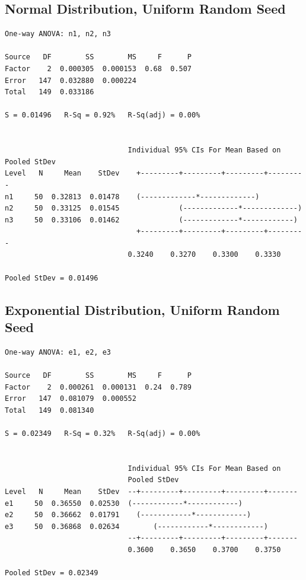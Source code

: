 \documentclass[letterpaper,10pt]{article}
\begin{document}
\subsection{Normal Distribution, Uniform Random Seed}
\begin{samepage}
\begin{verbatim}
One-way ANOVA: n1, n2, n3 

Source   DF        SS        MS     F      P
Factor    2  0.000305  0.000153  0.68  0.507
Error   147  0.032880  0.000224
Total   149  0.033186

S = 0.01496   R-Sq = 0.92%   R-Sq(adj) = 0.00%


                             Individual 95% CIs For Mean Based on Pooled StDev
Level   N     Mean    StDev    +---------+---------+---------+---------
n1     50  0.32813  0.01478    (-------------*-------------)
n2     50  0.33125  0.01545              (-------------*-------------)
n3     50  0.33106  0.01462              (-------------*------------)
                               +---------+---------+---------+---------
                             0.3240    0.3270    0.3300    0.3330

Pooled StDev = 0.01496
\end{verbatim}
\end{samepage}
\subsection{Exponential Distribution, Uniform Random Seed}
\begin{samepage}
\begin{verbatim}
One-way ANOVA: e1, e2, e3 

Source   DF        SS        MS     F      P
Factor    2  0.000261  0.000131  0.24  0.789
Error   147  0.081079  0.000552
Total   149  0.081340

S = 0.02349   R-Sq = 0.32%   R-Sq(adj) = 0.00%


                             Individual 95% CIs For Mean Based on
                             Pooled StDev
Level   N     Mean    StDev  --+---------+---------+---------+-------
e1     50  0.36550  0.02530  (------------*------------)
e2     50  0.36662  0.01791    (------------*------------)
e3     50  0.36868  0.02634        (------------*------------)
                             --+---------+---------+---------+-------
                             0.3600    0.3650    0.3700    0.3750

Pooled StDev = 0.02349
\end{verbatim}
\end{samepage}
\end{document}
